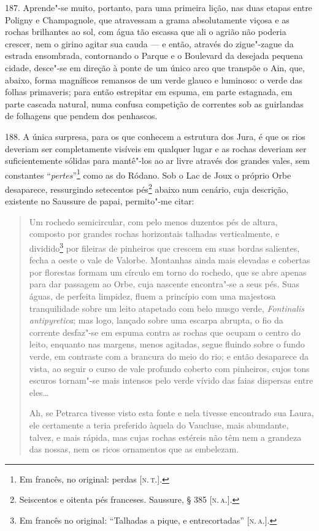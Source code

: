 187. Aprende"-se muito, portanto, para uma primeira lição, nas duas
etapas entre Poligny e Champagnole, que atravessam a grama absolutamente
viçosa e as rochas brilhantes ao sol, com água tão escassa que ali o
agrião não poderia crescer, nem o girino agitar sua cauda --- e então,
através do zigue"-zague da estrada ensombrada, contornando o Parque e o
Boulevard da desejada pequena cidade, desce"-se em direção à ponte de um
único arco que transpõe o Ain, que, abaixo, forma magníficos remansos de
um verde glauco e luminoso: o verde das folhas primaveris; para então
estrepitar em espuma, em parte estagnada, em parte cascada natural, numa
confusa competição de correntes sob as guirlandas de folhagens que
pendem dos penhascos.

188. A única surpresa, para os que conhecem a estrutura dos Jura, é que
os rios deveriam ser completamente visíveis em qualquer lugar e as
rochas deveriam ser suficientemente sólidas para mantê"-los ao ar livre
através dos grandes vales, sem constantes ``\emph{pertes}''\footnote{Em
  francês, no original: perdas {[}\textsc{n.\,t.}{]}.} como as do Ródano. Sob o
Lac de Joux o próprio Orbe desaparece, ressurgindo setecentos
pés\footnote{Seiscentos e oitenta pés franceses. Saussure, § 385 {[}\textsc{n.\,a.}{]}.} abaixo num cenário, cuja descrição, existente no Saussure
de papai, permito"-me citar:

\begin{quote}
Um rochedo semicircular, com pelo menos duzentos pés de altura,
composto por grandes rochas horizontais talhadas verticalmente, e
dividido\footnote{Em francês no original: ``Talhadas a pique, e
  entrecortadas'' {[}\textsc{n.\,a.}{]}.} por fileiras de pinheiros que crescem
em suas bordas salientes, fecha a oeste o vale de Valorbe. Montanhas
ainda mais elevadas e cobertas por florestas formam um círculo em torno
do rochedo, que se abre apenas para dar passagem ao Orbe, cuja nascente
encontra"-se a seus pés. Suas águas, de perfeita limpidez, fluem a
princípio com uma majestosa tranquilidade sobre um leito atapetado com
belo musgo verde, \emph{Fontinalis antipyretica}; mas logo, lançado
sobre uma escarpa abrupta, o fio da corrente desfaz"-se em espuma contra
as rochas que ocupam o centro do leito, enquanto nas margens, menos
agitadas, segue fluindo sobre o fundo verde, em contraste com a brancura
do meio do rio; e então desaparece da vista, ao seguir o curso de vale
profundo coberto com pinheiros, cujos tons escuros tornam"-se mais
intensos pelo verde vívido das faias dispersas entre eles\ldots{}

Ah, se Petrarca tivesse visto esta fonte e nela tivesse encontrado sua
Laura, ele certamente a teria preferido àquela do Vaucluse, mais
abundante, talvez, e mais rápida, mas cujas rochas estéreis não têm nem
a grandeza das nossas, nem os ricos ornamentos que as embelezam.
\end{quote}

